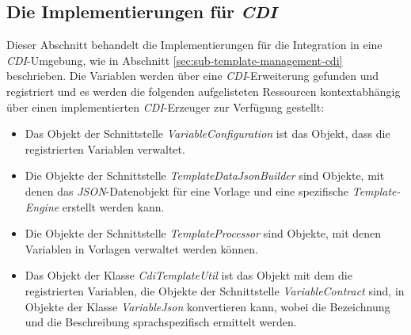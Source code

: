 \subsection{Die Implementierungen für \emph{CDI}}
\label{sec:sub-impl-integartion-cdi}
Dieser Abschnitt behandelt die Implementierungen für die Integration in eine \emph{CDI}-Umgebung, wie in Abschnitt \ref{sec:sub-template-management-cdi} beschrieben. Die Variablen werden über eine \emph{CDI}-Erweiterung gefunden und registriert und es werden die folgenden aufgelisteten Ressourcen kontextabhängig über einen implementierten \emph{CDI}-Erzeuger zur Verfügung gestellt: 
\begin{itemize}
 \item Das Objekt der Schnittstelle \emph{VariableConfiguration} 
 \newline
 ist das Objekt, dass die registrierten Variablen verwaltet.
 \item Die Objekte der Schnittstelle \emph{TemplateDataJsonBuilder}
 \newline
 sind Objekte, mit denen das \emph{JSON}-Datenobjekt für eine Vorlage und eine spezifische \emph{Template-Engine} erstellt werden kann.
 \item Die Objekte der Schnittstelle \emph{TemplateProcessor}
 \newline
 sind Objekte, mit denen Variablen in Vorlagen verwaltet werden können.
 \item Das Objekt der Klasse \emph{CdiTemplateUtil}
 \newline
 ist das Objekt mit dem die registrierten Variablen, die Objekte der Schnittstelle \emph{VariableContract} sind, in Objekte der Klasse \emph{VariableJson} konvertieren kann, wobei die Bezeichnung und die Beschreibung sprachspezifisch ermittelt werden.
\end{itemize}

